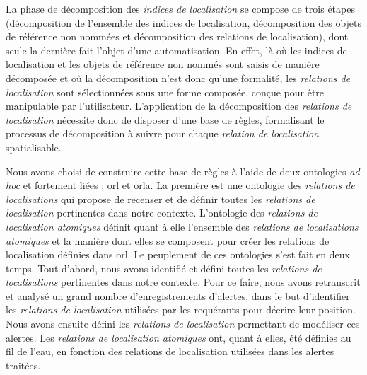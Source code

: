 La phase de décomposition des \emph{indices de localisation} se
compose de trois étapes (décomposition de l'ensemble des indices de
localisation, décomposition des objets de référence non nommées et
décomposition des relations de localisation), dont seule la dernière
fait l'objet d'une automatisation. En effet, là où les indices de
localisation et les objets de référence non nommés sont saisis de
manière décomposée et où la décomposition n'est donc qu'une formalité,
les \emph{relations de localisation} sont sélectionnées sous une forme
composée, conçue pour être manipulable par
l'utilisateur. L’application de la décomposition des \emph{relations
  de localisation} nécessite donc de disposer d'une base de règles,
formalisant le processus de décomposition à suivre pour chaque
\emph{relation de localisation} spatialisable.

Nous avons choisi de construire cette base de règles à l'aide de deux
ontologies \emph{ad hoc} et fortement liées : \ac{orl} et
\ac{orla}. La première est une ontologie des \emph{relations de
  localisations} qui propose de recenser et de définir toutes les
\emph{relations de localisation} pertinentes dans notre
contexte. L'ontologie des \emph{relations de localisation atomiques}
définit quant à elle l'ensemble des \emph{relations de localisations
  atomiques} et la manière dont elles se composent pour créer les
relations de localisation définies dans \ac{orl}. Le peuplement de ces
ontologies s'est fait en deux temps. Tout d'abord, nous avons
identifié et défini toutes les \emph{relations de localisations}
pertinentes dans notre contexte. Pour ce faire, nous avons retranscrit
et analysé un grand nombre d'enregistrements d'alertes, dans le but
d'identifier les \emph{relations de localisation} utilisées par les
requérants pour décrire leur position. Nous avons ensuite défini les
\emph{relations de localisation} permettant de modéliser ces
alertes. Les \emph{relations de localisation atomiques} ont, quant à
elles, été définies au fil de l'eau, en fonction des relations de
localisation utilisées dans les alertes traitées.

